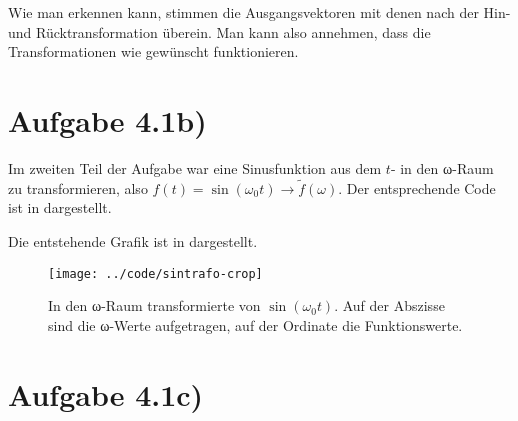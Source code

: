 Wie man erkennen kann, stimmen die Ausgangsvektoren mit denen nach der Hin- und
Rücktransformation überein. Man kann also annehmen, dass die Transformationen wie
gewünscht funktionieren.

\section*{Aufgabe 4.1b)}
Im zweiten Teil der Aufgabe war eine Sinusfunktion aus dem $t$- in den ω-Raum zu
transformieren, also $f(t) = \sin(ω_0t) → \tilde{f}(ω)$. Der entsprechende Code
ist in  dargestellt.



Die entstehende Grafik ist in  dargestellt.

\begin{figure}[htb]
\centering
  \texttt{[image: ../code/sintrafo-crop]}
  \caption{In den ω-Raum transformierte von $\sin(ω_0t)$. Auf der Abszisse sind
  die ω-Werte aufgetragen, auf der Ordinate die Funktionswerte.}
  \label{fig:sintrafo}
\end{figure}


\section*{Aufgabe 4.1c)}